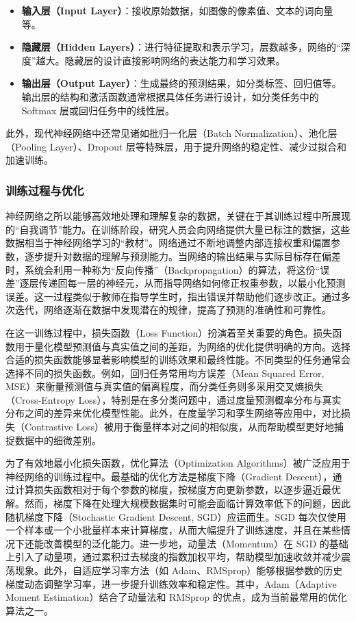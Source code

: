 \begin{itemize} 
    \item \textbf{输入层（Input Layer）}：接收原始数据，如图像的像素值、文本的词向量等。
    \item \textbf{隐藏层（Hidden Layers）}：进行特征提取和表示学习，层数越多，网络的“深度”越大。隐藏层的设计直接影响网络的表达能力和学习效果。
    \item \textbf{输出层（Output Layer）}：生成最终的预测结果，如分类标签、回归值等。输出层的结构和激活函数通常根据具体任务进行设计，如分类任务中的 Softmax 层或回归任务中的线性层。
\end{itemize}

此外，现代神经网络中还常见诸如批归一化层（Batch Normalization）、池化层（Pooling Layer）、Dropout 层等特殊层，用于提升网络的稳定性、减少过拟合和加速训练。

\subsubsection{训练过程与优化}

神经网络之所以能够高效地处理和理解复杂的数据，关键在于其训练过程中所展现的“自我调节”能力。在训练阶段，研究人员会向网络提供大量已标注的数据，这些数据相当于神经网络学习的“教材”。网络通过不断地调整内部连接权重和偏置参数，逐步提升对数据的理解与预测能力。当网络的输出结果与实际目标存在偏差时，系统会利用一种称为“反向传播”（Backpropagation）的算法，将这份“误差”逐层传递回每一层的神经元，从而指导网络如何修正权重参数，以最小化预测误差。这一过程类似于教师在指导学生时，指出错误并帮助他们逐步改正。通过多次迭代，网络逐渐在数据中发现潜在的规律，提高了预测的准确性和可靠性。

在这一训练过程中，损失函数（Loss Function）扮演着至关重要的角色。损失函数用于量化模型预测值与真实值之间的差距，为网络的优化提供明确的方向。选择合适的损失函数能够显著影响模型的训练效果和最终性能。不同类型的任务通常会选择不同的损失函数。例如，回归任务常用均方误差（Mean Squared Error, MSE）来衡量预测值与真实值的偏离程度，而分类任务则多采用交叉熵损失（Cross-Entropy Loss），特别是在多分类问题中，通过度量预测概率分布与真实分布之间的差异来优化模型性能。此外，在度量学习和孪生网络等应用中，对比损失（Contrastive Loss）被用于衡量样本对之间的相似度，从而帮助模型更好地捕捉数据中的细微差别。

为了有效地最小化损失函数，优化算法（Optimization Algorithms）被广泛应用于神经网络的训练过程中。最基础的优化方法是梯度下降（Gradient Descent），通过计算损失函数相对于每个参数的梯度，按梯度方向更新参数，以逐步逼近最优解。然而，梯度下降在处理大规模数据集时可能会面临计算效率低下的问题，因此随机梯度下降（Stochastic Gradient Descent, SGD）应运而生。SGD 每次仅使用一个样本或一个小批量样本来计算梯度，从而大幅提升了训练速度，并且在某些情况下还能改善模型的泛化能力。进一步地，动量法（Momentum）在 SGD 的基础上引入了动量项，通过累积过去梯度的指数加权平均，帮助模型加速收敛并减少震荡现象。此外，自适应学习率方法（如 Adam、RMSprop）能够根据参数的历史梯度动态调整学习率，进一步提升训练效率和稳定性。其中，Adam（Adaptive Moment Estimation）结合了动量法和 RMSprop 的优点，成为当前最常用的优化算法之一。

